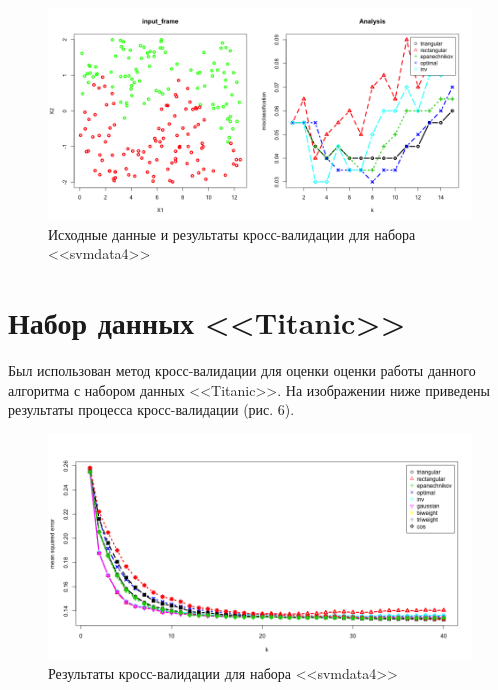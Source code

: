 \documentclass[]{article}
\numberwithin{equation}{section}
\begin{document}
        \begin{figure}[H]
            \centering
            \includegraphics[width = 1.0\linewidth]{data/svmdata.png}
            \caption{Исходные данные и результаты кросс-валидации для набора <<svmdata4>>}
        \end{figure}

    \section{Набор данных <<Titanic>>}

    Был использован метод кросс-валидации для оценки оценки работы данного алгоритма с набором данных <<Titanic>>. На изображении ниже приведены результаты процесса кросс-валидации (рис. 6).

    \begin{figure}[H]
        \centering
        \includegraphics[width = 1.0\linewidth]{data/titanic.png}
        \caption{Результаты кросс-валидации для набора <<svmdata4>>}
    \end{figure}
\end{document}
